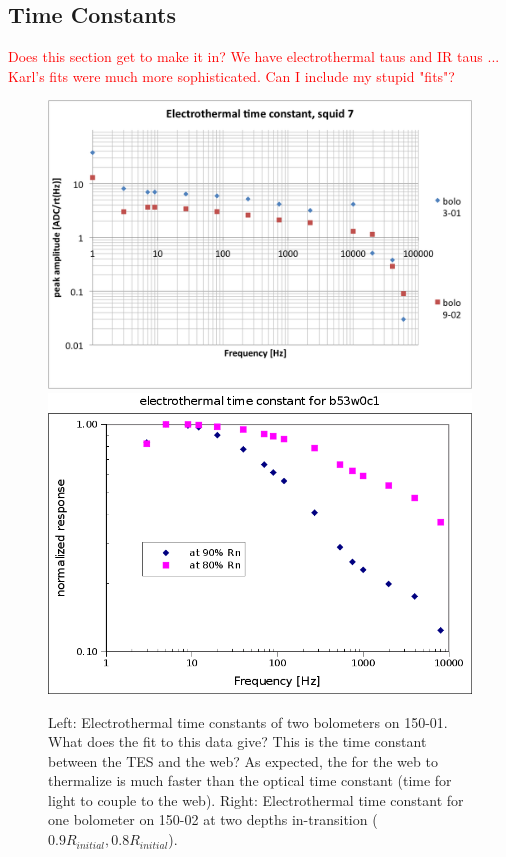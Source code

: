 %



\subsection{Time Constants}
\label{sec:time_constants}

\textcolor{red}{Does this section get to make it in? We have electrothermal taus and IR taus ... Karl's fits were much more sophisticated. Can I include my stupid "fits"?}

\begin{figure}[ht!]
\begin{center}
\includegraphics[width=0.48\columnwidth]{figures/Nb01_squid7_etau_morepts.png}
\includegraphics[width=0.48\columnwidth]{figures/b53w0c1_etau.png}
\caption{Left: Electrothermal time constants of two bolometers on 150-01. What does the fit to this data give? This is the time constant between the TES and the web? As expected, the for the web to thermalize is much faster than the optical time constant (time for light to couple to the web). Right: Electrothermal time constant for one bolometer on 150-02 at two depths in-transition ($0.9R_{initial}, 0.8R_{initial}$). 
\label{fig:electrothermal_tau} }
\end{center}
\end{figure}

